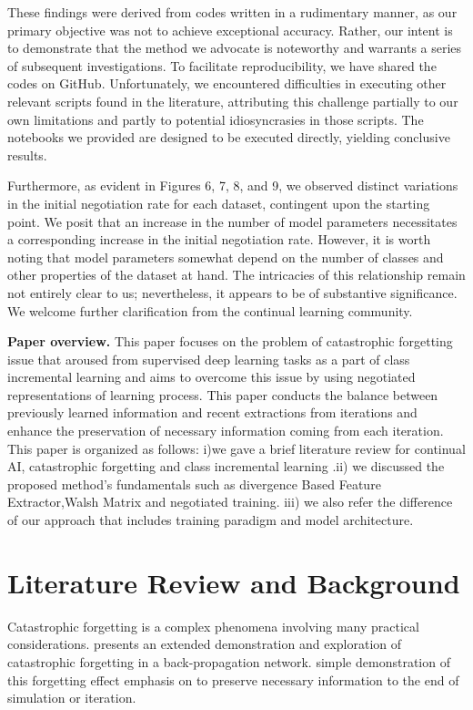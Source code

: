 \documentclass{article}
\begin{document}
These findings were derived from codes written in a rudimentary manner, as our primary objective was not to achieve exceptional accuracy. Rather, our intent is to demonstrate that the method we advocate is noteworthy and warrants a series of subsequent investigations. To facilitate reproducibility, we have shared the codes on GitHub. Unfortunately, we encountered difficulties in executing other relevant scripts found in the literature, attributing this challenge partially to our own limitations and partly to potential idiosyncrasies in those scripts. The notebooks we provided are designed to be executed directly, yielding conclusive results.

Furthermore, as evident in Figures 6, 7, 8, and 9, we observed distinct variations in the initial negotiation rate for each dataset, contingent upon the starting point. We posit that an increase in the number of model parameters necessitates a corresponding increase in the initial negotiation rate. However, it is worth noting that model parameters somewhat depend on the number of classes and other properties of the dataset at hand. The intricacies of this relationship remain not entirely clear to us; nevertheless, it appears to be of substantive significance. We welcome further clarification from the continual learning community.


\textbf{Paper overview.}
This paper focuses on the problem of catastrophic forgetting issue that aroused from supervised deep learning tasks as a part of class incremental learning and aims to overcome this issue by using negotiated representations of learning process. This paper conducts the balance between previously learned information and recent extractions from iterations and enhance the preservation of necessary information coming from each iteration. This paper is organized as follows: i)we gave a brief literature review for continual AI, catastrophic forgetting and class incremental learning .ii) we discussed the proposed method's fundamentals such as divergence Based Feature Extractor,Walsh Matrix and negotiated training. iii) we also refer the difference of our approach that includes training paradigm and model architecture. 

\section{Literature Review and Background }
Catastrophic forgetting is a complex phenomena involving many practical
considerations. \cite{ratcliff1990connectionist} presents an extended demonstration and exploration of catastrophic
forgetting in a back-propagation network. \cite{ratcliff1990connectionist} simple demonstration of
this forgetting effect emphasis on to preserve necessary information to the end of simulation or iteration. 
\end{document}
